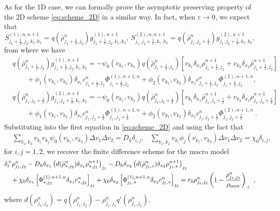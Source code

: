 \documentclass{aims} %
\theoremstyle{definition}
\begin{document}
{As for the 1D case, we can formally prove the asymptotic preserving property of the 2D scheme \eqref{eq:scheme_2D} in a similar way. 
In fact, when $\varepsilon\to 0$, we expect that  
\begin{equation*}
	S_{j_1+\frac12, j_2, k_1, k_2}^{(1), n, n+1} = q( {\bar{\rho}}_{j_1+\frac12,j_2}^n) g_{j_1+\frac12,j_2,k_1,k_2}^{(1), n+1}, \  S_{j_1, j_2+\frac12, k_1, k_2}^{(2), n, n+1} = q( {\bar{\rho}}_{j_1,j_2+\frac12}^n) g_{j_1,j_2+\frac12,k_1,k_2}^{(2), n+1},
\end{equation*}
from where we have
\begin{align*}
  & q( {\bar{\rho}}_{j_1+\frac12,j_2}^n) g_{j_1+\frac12,j_2,k_1,k_2}^{(1), n+1} = -\psi_{0}(v_{k_1}, v_{k_2})q( \bar{\rho}_{j_1+\frac12,j_2}^n)  \left[v_{k_1} \delta_{x_1} \rho_{j_1+\frac12, j_2}^{n+1} + v_{k_2} \delta_{x_2} \bar{\rho}_{j_1+\frac12, j_2}^{n+1} \right] \nonumber \\
        & \qquad  + \phi_{1}(v_{k_1}, v_{k_2})\delta_{x_1} c_{j_1+\frac12,j_2}^n \Phi^{(1),n+1,n}_{j_1+\frac12,j_2}+\phi_{2}(v_{k_1}, v_{k_2}) \delta_{x_2} c_{j_1+\frac12,j_2}^n
        \Phi^{(2),n+1,n}_{j_1+\frac12,j_2},\\
	&q( \bar{\rho}_{j_1,j_2+\frac12}^n) g_{j_1,j_2+\frac12,k_1,k_2}^{(2), n+1} = -\psi_{0}(v_{k_1}, v_{k_2})q( \bar{\rho}_{j_1,j_2+\frac12}^n)  \left[v_{k_1} \delta_{x_1} \bar{\rho}_{j_1, j_2+\frac12}^{n+1} + v_{k_2} \delta_{x_2} \rho_{j_1, j_2+\frac12}^{n+1} \right] \nonumber\\
    & \qquad  + \phi_{1}(v_{k_1}, v_{k_2})\delta_{x_1} c_{j_1,j_2+\frac12}^n\Phi^{(1),n+1,n}_{j_1,j_2+\frac12} +\phi_{2}(v_{k_1}, v_{k_2}) \delta_{x_2} c_{j_1,j_2+\frac12}^n 
    \Phi^{(2),n+1,n}_{j_1,j_2+\frac12}\ .
\end{align*}
Substituting into the first equation in \eqref{eq:scheme_2D} and using the fact that
\begin{align*}
	&\sum_{k_1,k_2} v_{k_i}v_{k_j} \psi_0(v_{k_1},v_{k_2}) \Delta v_1 \Delta v_2 = D_h \delta_{i,j},  
	&\sum_{k_1,k_2} v_{k_i} \phi_j(v_{k_1},v_{k_2}) \Delta v_1 \Delta v_2 = \chi_0\delta_{i,j},                   
\end{align*}
for $i,j = 1,2$, 
we recover the finite difference scheme for the macro model 
\begin{align*}
	&\delta_t^+ \rho_{j_1,j_2}^n   
    	- D_h \delta_{x_1} \left( d(\bar{\rho}_{*,j_2}^n) \delta_{x_1} \rho_{*,j_2}^{n+1}\right)_{j_1} 
	- D_h \delta_{x_2} \left( d(\bar{\rho}_{j_1,*}^n)\delta_{x_2} \rho_{j_1, *}^{n+1} \right)_{j_2} 	\nonumber \\
	 & \quad + \chi_0\delta_{x_1}\left[\Phi_{*,j_2}^{(1),n+1,n}\delta_{x_1} c_{*,j_2}^n\right]_{j_1} 
	 + \chi_0\delta_{x_2}\left[\Phi_{j_1,*}^{(1),n+1,n}\delta_{x_2} c_{j_1,*}^n\right]_{j_2}
    = r_0 \rho_{j_1,j_2}^{n}\left(1 - \frac{\rho_{j_1,j_2}^n}{\rho_{\rm max}}\right)_+\ ,
\end{align*}
where $d(\rho_{j_1,j_2}^n) = q(\rho_{j_1,j_2}^n) - \rho_{j_1,j_2}^n q'( \rho_{j_1,j_2}^n)$.

}
\end{document}
